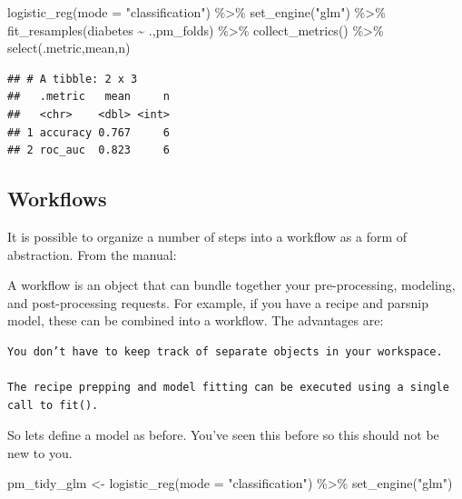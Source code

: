 \documentclass[
]{article}
\newenvironment{Shaded}{\begin{snugshade}}{\end{snugshade}}
\newcommand{\AttributeTok}[1]{\textcolor[rgb]{0.77,0.63,0.00}{#1}}
\newcommand{\FunctionTok}[1]{\textcolor[rgb]{0.00,0.00,0.00}{#1}}
\newcommand{\NormalTok}[1]{#1}
\newcommand{\OtherTok}[1]{\textcolor[rgb]{0.56,0.35,0.01}{#1}}
\newcommand{\SpecialCharTok}[1]{\textcolor[rgb]{0.00,0.00,0.00}{#1}}
\newcommand{\StringTok}[1]{\textcolor[rgb]{0.31,0.60,0.02}{#1}}
\begin{document}
\begin{Shaded}
\begin{Highlighting}[]
\FunctionTok{logistic\_reg}\NormalTok{(}\AttributeTok{mode =} \StringTok{"classification"}\NormalTok{) }\SpecialCharTok{\%\textgreater{}\%}
  \FunctionTok{set\_engine}\NormalTok{(}\StringTok{"glm"}\NormalTok{) }\SpecialCharTok{\%\textgreater{}\%}
  \FunctionTok{fit\_resamples}\NormalTok{(diabetes }\SpecialCharTok{\textasciitilde{}}\NormalTok{ .,pm\_folds) }\SpecialCharTok{\%\textgreater{}\%} 
  \FunctionTok{collect\_metrics}\NormalTok{() }\SpecialCharTok{\%\textgreater{}\%} 
  \FunctionTok{select}\NormalTok{(.metric,mean,n)}
\end{Highlighting}
\end{Shaded}

\begin{verbatim}
## # A tibble: 2 x 3
##   .metric   mean     n
##   <chr>    <dbl> <int>
## 1 accuracy 0.767     6
## 2 roc_auc  0.823     6
\end{verbatim}

\hypertarget{workflows}{%
\subsection{Workflows}\label{workflows}}

It is possible to organize a number of steps into a workflow as a form
of abstraction. From the manual:

A workflow is an object that can bundle together your pre-processing,
modeling, and post-processing requests. For example, if you have a
recipe and parsnip model, these can be combined into a workflow. The
advantages are:

\begin{verbatim}
You don’t have to keep track of separate objects in your workspace.

The recipe prepping and model fitting can be executed using a single call to fit().
\end{verbatim}

So lets define a model as before. You've seen this before so this should
not be new to you.

\begin{Shaded}
\begin{Highlighting}[]
\NormalTok{pm\_tidy\_glm }\OtherTok{\textless{}{-}} \FunctionTok{logistic\_reg}\NormalTok{(}\AttributeTok{mode =} \StringTok{"classification"}\NormalTok{) }\SpecialCharTok{\%\textgreater{}\%}
  \FunctionTok{set\_engine}\NormalTok{(}\StringTok{"glm"}\NormalTok{) }
\end{Highlighting}
\end{Shaded}
\end{document}
